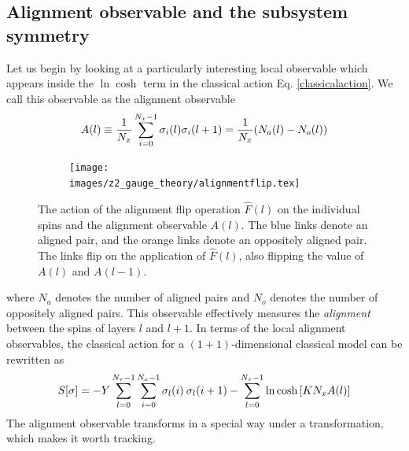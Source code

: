 \documentclass[../thesis_main.tex]{subfiles}
\begin{document}
\subsection{Alignment observable and the subsystem symmetry}\label{alignmentsection}
Let us begin by looking at a particularly interesting local observable which appears inside the $\ln \cosh$ term in the classical action Eq. \eqref{classicalaction}. We call this observable as the alignment observable 
\begin{equation}
    A(l) \equiv \frac{1}{N_x} \sum_{i=0}^{N_x-1} \sigma_i(l) \sigma_i(l+1) = \frac{1}{N_x}\qty(N_a(l) - N_o(l))
\end{equation}
\begin{figure}[t!]
    \centering
    \begin{subfigure}[b]{0.6\textwidth}  %
        \centering
        \texttt{[image: images/z2\_gauge\_theory/alignmentflip.tex]}
    \end{subfigure}
    \caption{The action of the alignment flip operation $\hat{F}(l)$ on the individual spins and the alignment observable $A(l)$. The blue links denote an aligned pair, and the orange links denote an oppositely aligned pair. The links flip on the application of $\hat{F}(l)$, also flipping the value of $A(l)$ and $A(l-1)$.}
    \label{alignflip}
\end{figure}
\FloatBarrier
where $N_a$ denotes the number of aligned pairs and $N_o$ denotes the number of oppositely aligned pairs. This observable effectively measures the \textit{alignment} between the spins of layers $l$ and $l+1$. In terms of the local alignment observables, the classical action for a $(1+1)$-dimensional classical model can be rewritten as
\begin{equation}
    S[\sigma] = -Y\sum_{l=0}^{N_\tau-1} \sum_{i=0}^{N_x-1} \sigma_l(i) \: \sigma_l(i+1) - \sum_{l=0}^{N_\tau-1} \ln \cosh \qty[K N_x A(l)]
    \label{2daction}
\end{equation}
The alignment observable transforms in a special way under a transformation, which makes it worth tracking. 
\end{document}
